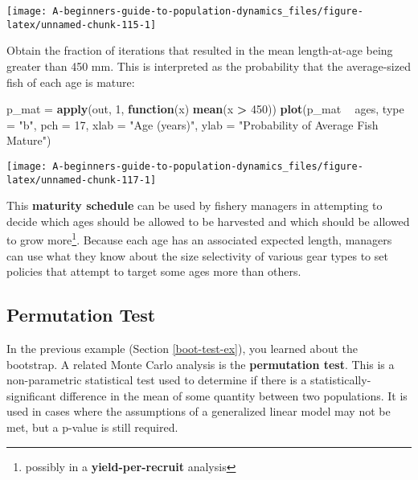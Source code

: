 \documentclass[]{book}
\newenvironment{Shaded}{\begin{snugshade}}{\end{snugshade}}
\newcommand{\ControlFlowTok}[1]{\textcolor[rgb]{0.13,0.29,0.53}{\textbf{#1}}}
\newcommand{\DataTypeTok}[1]{\textcolor[rgb]{0.13,0.29,0.53}{#1}}
\newcommand{\DecValTok}[1]{\textcolor[rgb]{0.00,0.00,0.81}{#1}}
\newcommand{\KeywordTok}[1]{\textcolor[rgb]{0.13,0.29,0.53}{\textbf{#1}}}
\newcommand{\NormalTok}[1]{#1}
\newcommand{\OperatorTok}[1]{\textcolor[rgb]{0.81,0.36,0.00}{\textbf{#1}}}
\newcommand{\StringTok}[1]{\textcolor[rgb]{0.31,0.60,0.02}{#1}}
\let\rmarkdownfootnote\footnote%
\def\footnote{\protect\rmarkdownfootnote}
\begin{document}
\begin{center}\texttt{[image: A-beginners-guide-to-population-dynamics\_files/figure-latex/unnamed-chunk-115-1]} \end{center}

Obtain the fraction of iterations that resulted in the mean length-at-age being greater than 450 mm. This is interpreted as the probability that the average-sized fish of each age is mature:

\begin{Shaded}
\begin{Highlighting}[]
\NormalTok{p_mat =}\StringTok{ }\KeywordTok{apply}\NormalTok{(out, }\DecValTok{1}\NormalTok{, }\ControlFlowTok{function}\NormalTok{(x) }\KeywordTok{mean}\NormalTok{(x }\OperatorTok{>}\StringTok{ }\DecValTok{450}\NormalTok{))}
\KeywordTok{plot}\NormalTok{(p_mat }\OperatorTok{~}\StringTok{ }\NormalTok{ages, }\DataTypeTok{type =} \StringTok{"b"}\NormalTok{, }\DataTypeTok{pch =} \DecValTok{17}\NormalTok{,}
     \DataTypeTok{xlab =} \StringTok{"Age (years)"}\NormalTok{, }\DataTypeTok{ylab =} \StringTok{"Probability of Average Fish Mature"}\NormalTok{)}
\end{Highlighting}
\end{Shaded}

\begin{center}\texttt{[image: A-beginners-guide-to-population-dynamics\_files/figure-latex/unnamed-chunk-117-1]} \end{center}

This \textbf{maturity schedule} can be used by fishery managers in attempting to decide which ages should be allowed to be harvested and which should be allowed to grow more\footnote{possibly in a \textbf{yield-per-recruit} analysis}. Because each age has an associated expected length, managers can use what they know about the size selectivity of various gear types to set policies that attempt to target some ages more than others.

\hypertarget{perm-test-ex}{%
\subsection{Permutation Test}\label{perm-test-ex}}

In the previous example (Section \ref{boot-test-ex}), you learned about the bootstrap. A related Monte Carlo analysis is the \textbf{permutation test}. This is a non-parametric statistical test used to determine if there is a statistically-significant difference in the mean of some quantity between two populations. It is used in cases where the assumptions of a generalized linear model may not be met, but a p-value is still required.
\end{document}
